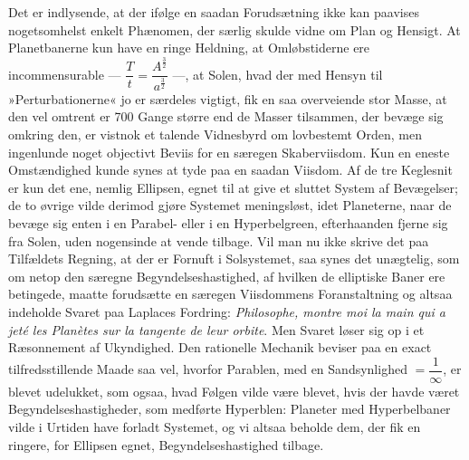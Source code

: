 \documentclass[12pt]{book}
\newcommand{\apage}[1]{\marginnote{\footnotesize\textit{[#1]}}}
\begin{document}
Det er indlysende, at der ifølge en saadan Forudsætning ikke kan paavises
nogetsomhelst enkelt Phænomen, der særlig skulde vidne om Plan og Hensigt.
At Planetbanerne kun have en ringe Heldning, at Omløbstiderne ere
incommensurable --- $\dfrac{T}{t} = \dfrac{A^{\frac32}}{a^{\frac32}}$ ---,
at Solen, hvad der med Hensyn til »Perturbationerne« jo \apage{167} er særdeles vigtigt,
fik en saa overveiende stor Masse, at den vel omtrent er 700 Gange større
end de Masser tilsammen, der bevæge sig omkring den, er vistnok et talende
Vidnesbyrd om lovbestemt Orden, men ingenlunde noget objectivt Beviis for
en særegen Skaberviisdom. Kun en eneste Omstændighed kunde synes at tyde
paa en saadan Viisdom. Af de tre Keglesnit er kun det ene, nemlig Ellipsen,
egnet til at give et sluttet System af Bevægelser; de to øvrige vilde
derimod gjøre Systemet meningsløst, idet Planeterne, naar de bevæge sig
enten i en Parabel- eller i en Hyperbelgreen, efterhaanden fjerne sig fra
Solen, uden nogensinde at vende tilbage. Vil man nu ikke skrive det paa
Tilfældets Regning, at der er Fornuft i Solsystemet, saa synes det
unægtelig, som om netop den særegne Begyndelseshastighed, af hvilken de
elliptiske Baner ere betingede, maatte forudsætte en særegen Viisdommens
Foranstaltning og altsaa indeholde Svaret paa Laplaces Fordring:
\emph{Philosophe, montre moi la main qui a jeté les Planètes sur la
tangente de leur orbite}. Men Svaret løser sig op i et Ræsonnement af
Ukyndighed. Den rationelle Mechanik beviser paa en exact tilfredsstillende
Maade saa vel, hvorfor Parablen, med en Sandsynlighed $= \dfrac{1}{\infty}$,
er blevet udelukket, som ogsaa, hvad Følgen vilde være blevet, hvis der
havde været Begyndelseshastigheder, som medførte Hyperblen: Planeter med
Hyperbelbaner vilde i Urtiden have forladt Systemet, og vi altsaa beholde \apage{168} 
dem, der fik en ringere, for Ellipsen egnet, Begyndelseshastighed tilbage.
\end{document}

